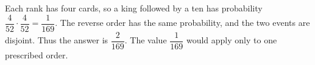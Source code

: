 Each rank has four cards, so a king followed by a ten has probability $\dfrac{4}{52}\cdot\dfrac{4}{52}=\dfrac{1}{169}$. The reverse order has the same probability, and the two events are disjoint. Thus the answer is $\boxed{\dfrac{2}{169}}$. The value $\dfrac{1}{169}$ would apply only to one prescribed order.
